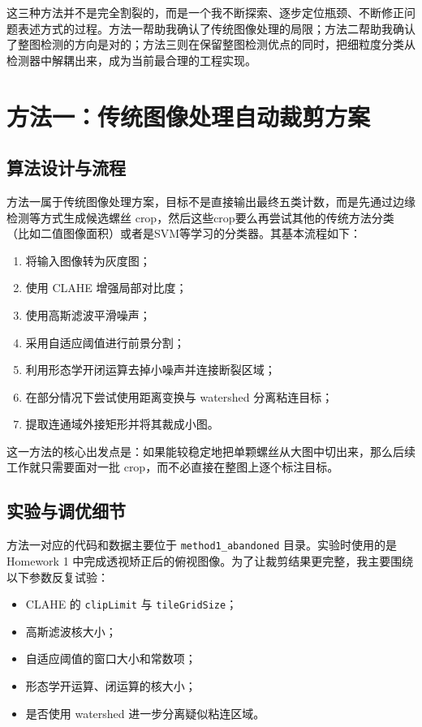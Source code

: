 \documentclass[12pt,a4paper]{ctexart}
\begin{document}
这三种方法并不是完全割裂的，而是一个我不断探索、逐步定位瓶颈、不断修正问题表述方式的过程。方法一帮助我确认了传统图像处理的局限；方法二帮助我确认了整图检测的方向是对的；方法三则在保留整图检测优点的同时，把细粒度分类从检测器中解耦出来，成为当前最合理的工程实现。

\section{方法一：传统图像处理自动裁剪方案}

\subsection{算法设计与流程}

方法一属于传统图像处理方案，目标不是直接输出最终五类计数，而是先通过边缘检测等方式生成候选螺丝 crop，然后这些crop要么再尝试其他的传统方法分类（比如二值图像面积）或者是SVM等学习的分类器。其基本流程如下：
\begin{enumerate}
    \item 将输入图像转为灰度图；
    \item 使用 CLAHE 增强局部对比度；
    \item 使用高斯滤波平滑噪声；
    \item 采用自适应阈值进行前景分割；
    \item 利用形态学开闭运算去掉小噪声并连接断裂区域；
    \item 在部分情况下尝试使用距离变换与 watershed 分离粘连目标；
    \item 提取连通域外接矩形并将其裁成小图。
\end{enumerate}

这一方法的核心出发点是：如果能较稳定地把单颗螺丝从大图中切出来，那么后续工作就只需要面对一批 crop，而不必直接在整图上逐个标注目标。

\subsection{实验与调优细节}

方法一对应的代码和数据主要位于 \texttt{method1\_abandoned} 目录。实验时使用的是 Homework 1 中完成透视矫正后的俯视图像。为了让裁剪结果更完整，我主要围绕以下参数反复试验：
\begin{itemize}
    \item CLAHE 的 \texttt{clipLimit} 与 \texttt{tileGridSize}；
    \item 高斯滤波核大小；
    \item 自适应阈值的窗口大小和常数项；
    \item 形态学开运算、闭运算的核大小；
    \item 是否使用 watershed 进一步分离疑似粘连区域。
\end{itemize}
\end{document}
